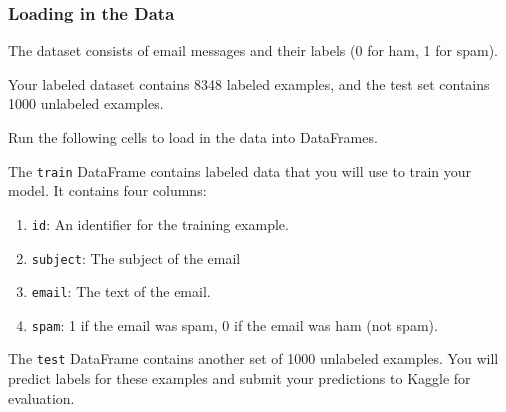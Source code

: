 \documentclass[11pt]{article}
\providecommand{\tightlist}{%
      \setlength{\itemsep}{0pt}\setlength{\parskip}{0pt}}
\begin{document}
    \subsubsection{Loading in the Data}\label{loading-in-the-data}

The dataset consists of email messages and their labels (0 for ham, 1
for spam).

Your labeled dataset contains 8348 labeled examples, and the test set
contains 1000 unlabeled examples.

Run the following cells to load in the data into DataFrames.

The \texttt{train} DataFrame contains labeled data that you will use to
train your model. It contains four columns:

\begin{enumerate}
\def\labelenumi{\arabic{enumi}.}
\tightlist
\item
  \texttt{id}: An identifier for the training example.
\item
  \texttt{subject}: The subject of the email
\item
  \texttt{email}: The text of the email.
\item
  \texttt{spam}: 1 if the email was spam, 0 if the email was ham (not
  spam).
\end{enumerate}

The \texttt{test} DataFrame contains another set of 1000 unlabeled
examples. You will predict labels for these examples and submit your
predictions to Kaggle for evaluation.
\end{document}
